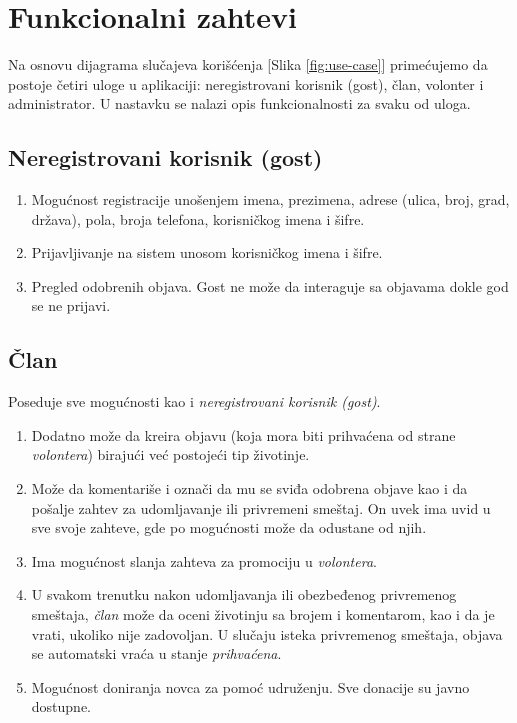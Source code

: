 \section{Funkcionalni zahtevi}
\par Na osnovu dijagrama slučajeva korišćenja [Slika \ref{fig:use-case}] primećujemo da postoje četiri uloge u aplikaciji: neregistrovani korisnik (gost), član, volonter i administrator. 
U nastavku se nalazi opis funkcionalnosti za svaku od uloga.
\subsection{Neregistrovani korisnik (gost)} 
    \begin{enumerate}
        \item Mogućnost registracije unošenjem imena, prezimena, adrese (ulica, broj, grad, država), pola, broja telefona, korisničkog imena i šifre.
        \item Prijavljivanje na sistem unosom korisničkog imena i šifre.
        \item Pregled odobrenih objava. Gost ne može da interaguje sa objavama dokle god se ne prijavi.
    \end{enumerate}
\subsection{Član}
    \par Poseduje sve mogućnosti kao i \textit{neregistrovani korisnik (gost)}. 
    \begin{enumerate}
        \item Dodatno može da kreira objavu (koja mora biti prihvaćena od strane \textit{volontera}) birajući već postojeći tip životinje. 
        \item Može da komentariše i označi da mu se sviđa odobrena objave kao i da pošalje zahtev za udomljavanje ili privremeni smeštaj. 
        On uvek ima uvid u sve svoje zahteve, gde po mogućnosti može da odustane od njih. 
        \item Ima mogućnost slanja zahteva za promociju u \textit{volontera}.
        \item U svakom trenutku nakon udomljavanja ili obezbeđenog privremenog sme\-štaja, \textit{član} može da oceni životinju sa brojem i komentarom, kao i da je vrati, ukoliko nije 
        zadovoljan. U slučaju isteka privremenog smeštaja, objava se automatski vraća u stanje \textit{prihvaćena}.
        \item Mogućnost doniranja novca za pomoć udruženju. Sve donacije su javno dostupne.
    \end{enumerate}
